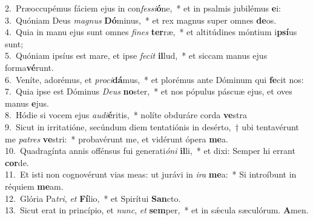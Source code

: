 {2.~}Præoccupémus fáciem ejus in con\textit{fes}\textit{si}\textbf{ó}ne,~* et in psalmis jubilémus \textbf{e}i:\\
{3.~}Quóniam Deus \textit{ma}\textit{gnus} \textbf{Dó}minus,~* et rex magnus super omnes \textbf{de}os.\\
{4.~}Quia in manu ejus sunt omnes \textit{fi}\textit{nes} \textbf{ter}ræ,~* et altitúdines móntium i\textbf{psí}us sunt;\\
{5.~}Quóniam ipsíus est mare, et ipse \textit{fe}\textit{cit} \textbf{il}lud,~* et siccam manus ejus forma\textbf{vé}runt.\\
{6.~}Veníte, adorémus, et \textit{pro}\textit{ci}\textbf{dá}mus,~* et plorémus ante Dóminum qui \textbf{fe}cit nos:\\
{7.~}Quia ipse est Dóminus \textit{De}\textit{us} \textbf{no}ster,~* et nos pópulus páscuæ ejus, et oves manus \textbf{e}jus.\\
{8.~}Hódie si vocem ejus \textit{au}\textit{di}\textbf{é}ritis,~* nolíte obduráre corda \textbf{ve}stra\\
{9.~}Sicut in irritatióne, secúndum diem tentatiónis in desérto,~† ubi tentavérunt me \textit{pa}\textit{tres} \textbf{ve}stri:~* probavérunt me, et vidérunt ópera \textbf{me}a.\\
{10.~}Quadragínta annis offénsus fui generati\textit{ó}\textit{ni} \textbf{il}li,~* et dixi: Semper hi errant \textbf{cor}de.\\
{11.~}Et isti non cognovérunt vias meas: ut jurávi in \textit{i}\textit{ra} \textbf{me}a:~* Si introíbunt in réquiem \textbf{me}am.\\
{12.~}Glória Pa\textit{tri}, \textit{et} \textbf{Fí}lio,~* et Spirítui \textbf{San}cto.\\
{13.~}Sicut erat in princípio, et \textit{nunc}, \textit{et} \textbf{sem}per,~* et in sǽcula sæculórum. \textbf{A}men.\\
